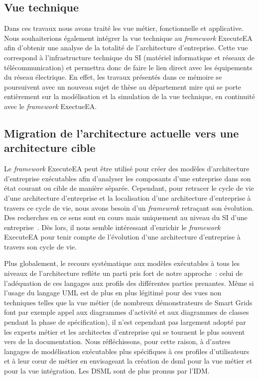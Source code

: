 \subsection{Vue technique}

    Dans ces travaux nous avons traité les vue métier, fonctionnelle et applicative. Nous souhaiterions également
    intégrer la vue technique au \emph{framework} ExecuteEA afin d'obtenir une analyse de la totalité de
    l'architecture d'entreprise. Cette vue correspond à l'infrastructure technique du SI
    (matériel informatique et réseaux de télécommunication) et permettra donc de faire le lien direct avec les équipements
    du réseau électrique. En effet, les travaux présentés dans ce mémoire se poursuivent avec un nouveau sujet de thèse
    au département \gls{mire} qui se porte entièrement sur la modélisation et la simulation de la vue technique, en continuité
    avec le \emph{framework} ExectueEA.

\subsection{Migration de l'architecture actuelle vers une architecture cible}

    Le \emph{framework} ExecuteEA peut être utilisé pour créer des modèles d'architecture d'entreprise exécutables
    afin d'analyser les composants d'une entreprise dans son état courant ou cible de manière séparée. 
    Cependant, pour retracer le cycle de vie d'une architecture d'entreprise et la localisation d'une architecture d'entreprise à
    travers ce cycle de vie, nous avons besoin d'un \emph{framewrok} retraçant son évolution. Des recherches en ce sens sont en cours
    mais uniquement au niveau du SI d'une entreprise~\cite{metrailler_evolis_2014}. Dès lors, il nous semble intéressant d'enrichir le
    \emph{framework} ExecuteEA pour tenir compte de l'évolution d'une architecture d'entreprise à travers son cycle de vie.

Plus globalement, le recours systématique aux modèles exécutables à tous les
niveaux de l'architecture reflète un parti pris fort de notre approche~: celui de l'adéquation de ces langages aux profils des
différentes parties prenantes. Même si l'usage du langage UML est de plus en plus
légitimé pour des vues non techniques telles que la vue métier (de nombreux démonstrateurs de Smart Grids font par exemple appel aux diagrammes d'activité et aux diagrammes de classes pendant la phase de spécification), il n'est
cependant pas largement adopté par les experts métier et les architectes d'entreprise qui se tournent
le plus souvent vers de la documentation. Nous réfléchissons, pour cette raison, à d'autres
langages de modélisation exécutables plus spécifiques à ces profiles d'utilisateurs et à leur cœur de métier
en envisageant la création de \gls{dsml} pour la vue métier et pour la vue intégration. Les DSML sont de plus promus par l'IDM.

